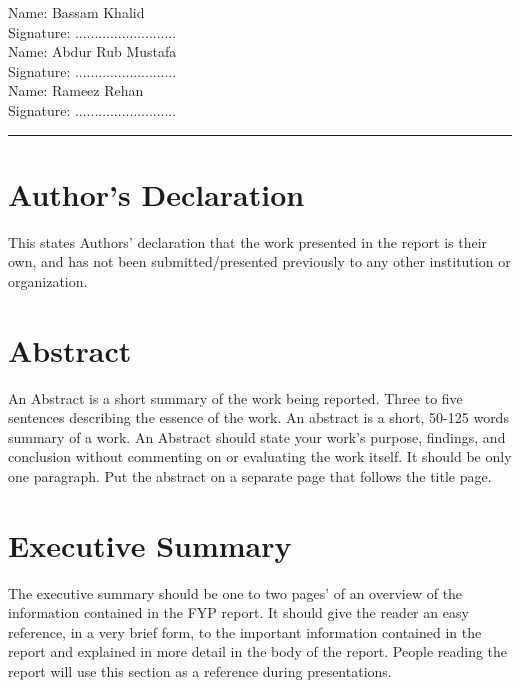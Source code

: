\documentclass{FastFyp}
\begin{document}
\begin{flushright}
Name: Bassam Khalid
\\[3ex]
Signature: ..........................
\\[6ex]
Name: Abdur Rub Mustafa
\\[3ex]
Signature: ..........................
\\[6ex]
Name: Rameez Rehan
\\[3ex]
Signature: ..........................

\end{flushright} 

\vspace{5 cm} %
 
\hrule %

\section*{Author's Declaration}
This states Authors’ declaration that the work presented in the report is their own, and has not been submitted/presented previously to any other institution or organization.
\pagebreak
\section*{Abstract}
An Abstract is a short summary of the work being reported. Three to five sentences describing the essence of the work. An abstract is a short, 50-125 words summary of a work. An Abstract should state your work's purpose, findings, and conclusion without commenting on or evaluating the work itself.  It should be only one paragraph. Put the abstract on a separate page that follows the title page.
\pagebreak 

\section*{Executive Summary}
The executive summary should be one to two pages’ of an overview of the information contained in the FYP report.  It should give the reader an easy reference, in a very brief form, to the important information contained in the report and explained in more detail in the body of the report. People reading the report will use this section as a reference during presentations. 
\pagebreak


\pagestyle{fancy} %
\tableofcontents

\pagebreak
\listoffigures	%
\pagebreak
\listoftables %
\end{document}
